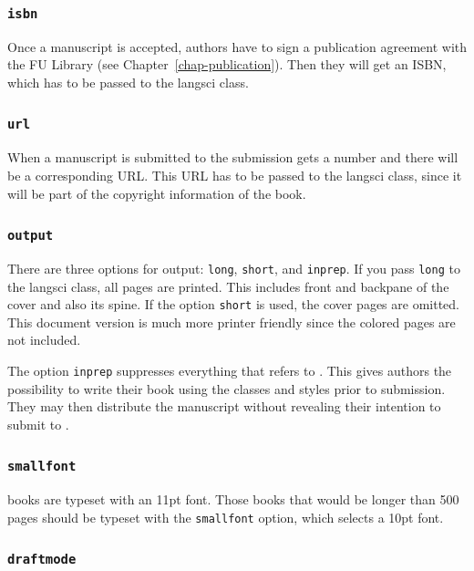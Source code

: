 \subsubsection{\texttt{isbn}}

Once a manuscript is accepted, authors have to sign a publication agreement with the FU Library (see
Chapter~\ref{chap-publication}). Then they will get an ISBN, which has to be passed to the langsci class.

\subsubsection{\texttt{url}}

When a manuscript is submitted to \lsp the submission gets a number and there will be a
corresponding URL. This URL has to be passed to the langsci class, since it will be part of the
copyright information of the book.

\subsubsection{\texttt{output}}

There are three options for output: \texttt{long}, \texttt{short}, and \texttt{inprep}. If you pass
\texttt{long} to the langsci class, all pages are printed. This includes front and backpane of the
cover and also its spine. If the option \texttt{short} is used, the cover pages are omitted. This
document version is much more printer friendly since the colored pages are not included.

The option \texttt{inprep} suppresses everything that refers to \lsp. This gives authors the
possibility to write their book using the \lsp classes and styles prior to submission. They may then
distribute the manuscript without revealing their intention to submit to \lsp.

\subsubsection{\texttt{smallfont}}

\lsp{} books are typeset with an 11pt font. Those books that would be longer than 500 pages should be
typeset with the \texttt{smallfont} option, which selects a 10pt font.

\subsubsection{\texttt{draftmode}}


